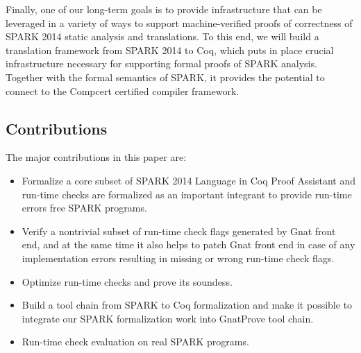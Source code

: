 Finally, one of our long-term goals is to provide infrastructure that can be 
leveraged in a variety of ways to support machine-verified proofs of 
correctness of SPARK 2014 static analysis and 
translations. To this end, we will build a translation framework 
from SPARK 2014 to Coq, which puts in place crucial infrastructure 
necessary for supporting formal proofs of SPARK analysis. Together 
with the formal semantics of SPARK, it provides the potential to 
connect to the Compcert \cite{Leroy:09} certified compiler framework.

\subsection{Contributions}
The major contributions in this paper are:
\begin{itemize}
\item Formalize a core subset of SPARK 2014 Language in Coq Proof Assistant and
run-time checks are formalized as an important integrant to provide run-time
errors free SPARK programs.
\item Verify a nontrivial subset of run-time check flags generated by Gnat
front end, and at the same time it also helps to patch Gnat front end in case of
any implementation errors resulting in missing or wrong run-time check flags.
\item Optimize run-time checks and prove its soundess.  
\item Build a tool chain from SPARK to Coq formalization and make it possible to
integrate our SPARK formalization work into GnatProve tool chain.
\item Run-time check evaluation on real SPARK programs.
\end{itemize}